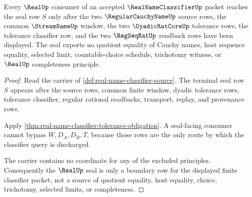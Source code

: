 \begin{theorem}
\label{thm:real-name-classifier-seal-boundary}
Every $\RealUp$ consumer of an accepted $\RealNameClassifierUp$ packet reaches the seal row $S$ only after the two $\RegularCauchyNameUp$ source rows, the common $\StreamNameUp$ window, the two $\DyadicRatCoreUp$ tolerance rows, the tolerance classifier row, and the two $\RegSeqRatUp$ readback rows have been displayed. The seal exports no quotient equality of Cauchy names, host sequence equality, selected limit, countable-choice schedule, trichotomy witness, or $\RealUp$ completeness principle.
\end{theorem}
\begin{proof}
Read the carrier of \autoref{def:real-name-classifier-source}. The terminal seal row $S$ appears after the source rows, common finite window, dyadic tolerance rows, tolerance classifier, regular rational readbacks, transport, replay, and provenance rows.

Apply \autoref{thm:real-name-classifier-tolerance-obligation}. A seal-facing consumer cannot bypass $W,D_A,D_B,T$, because those rows are the only route by which the classifier query is discharged.

The carrier contains no coordinate for any of the excluded principles. Consequently the $\RealUp$ seal is only a boundary row for the displayed finite classifier packet, not a source of quotient equality, host equality, choice, trichotomy, selected limits, or completeness.
\end{proof}

